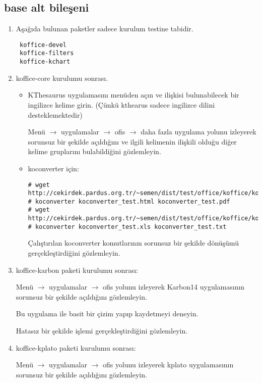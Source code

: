 \documentclass[a4paper,10pt]{article}
\begin{document}
\subsection*{base alt bileşeni}
\begin{enumerate}
\item Aşağıda bulunan paketler sadece kurulum testine tabidir.

\begin{verbatim}
 koffice-devel 
 koffice-filters
 koffice-kchart
\end{verbatim}
\item koffice-core kurulumu sonrası.

\begin{itemize}
\item KThesaurus uygulamasını menüden açın ve ilişkisi bulunabilecek bir ingilizce kelime girin. (Çünkü kthearus sadece ingilizce dilini desteklemektedir)

Menü $\rightarrow$ uygulamalar $\rightarrow$ ofis $\rightarrow$ daha fazla uygulama yolunu izleyerek sorunsuz bir şekilde açıldığını ve ilgili kelimenin ilişkili olduğu diğer kelime gruplarını bulabildiğini gözlemleyin.

\item koconverter için:
\begin{verbatim}
# wget http://cekirdek.pardus.org.tr/~semen/dist/test/office/koffice/koconverter_test.html
# koconverter koconverter_test.html koconverter_test.pdf
# wget http://cekirdek.pardus.org.tr/~semen/dist/test/office/koffice/koconverter_test.xls
# koconverter koconverter_test.xls koconverter_test.txt
\end{verbatim}

Çalıştırılan koconverter komutlarının sorunsuz bir şekilde dönüşümü gerçekleştirdiğini gözlemleyin.
\end{itemize}
\item koffice-karbon paketi kurulumu sonrası:

Menü $\rightarrow$ uygulamalar $\rightarrow$ ofis yolunu izleyerek Karbon14 uygulamasının sorunsuz bir şekilde açıldığını gözlemleyin.

Bu uygulama ile basit bir çizim yapıp kaydetmeyi deneyin.

Hatasız bir şekilde işlemi gerçekleştirdiğini gözlemleyin.

\item koffice-kplato paketi kurulumu sonrası:

Menü $\rightarrow$ uygulamalar $\rightarrow$ ofis yolunu izleyerek kplato uygulamasının sorunsuz bir şekilde açıldığını gözlemleyin.


\end{enumerate}
\end{document}
